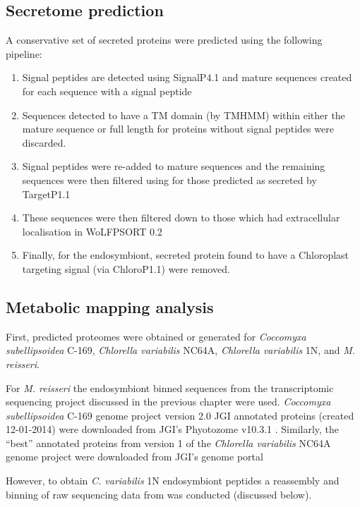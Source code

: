 \subsection{Secretome prediction}

A conservative set of secreted proteins were predicted 
using the following pipeline:
\begin{enumerate}
    \item Signal peptides are detected using SignalP4.1 and mature sequences
        created for each sequence with a signal peptide
    \item Sequences detected to have a TM domain (by TMHMM) within either the mature sequence or 
        full length for proteins without signal peptides were discarded.
    \item Signal peptides were re-added to mature sequences and the 
        remaining sequences were then filtered using for those predicted as secreted by TargetP1.1 
    \item These sequences were then filtered down to those which had extracellular
        localisation in WoLFPSORT 0.2 
    \item Finally, for the endosymbiont, secreted protein found to have a Chloroplast
        targeting signal (via ChloroP1.1) were removed.
\end{enumerate}

\subsection{Metabolic mapping analysis}

First, predicted proteomes were obtained or generated for
\textit{Coccomyxa subellipsoidea} C-169, \textit{Chlorella variabilis}
NC64A, \textit{Chlorella variabilis} 1N, and \textit{M. reisseri}. 

For \textit{M. reisseri} the endosymbiont binned sequences from the transcriptomic
sequencing project discussed in the previous chapter were used. 
\textit{Coccomyxa subellipsoidea} C-169 genome project \citep{Blanc2012} version 2.0 
JGI annotated proteins (created 12-01-2014) were downloaded from JGI's
Phyotozome v10.3.1 \citep{Goodstein2012}. 
Similarly, the ``best'' annotated proteins from
version 1 of the \textit{Chlorella variabilis} NC64A genome project \citep{Blanc2010}
were downloaded from JGI's genome portal \citep{Grigoriev2011,Nordberg2014}

However, to obtain \textit{C. variabilis} 1N endosymbiont peptides 
a reassembly and binning of raw sequencing data from \citep{Kodama2014}
was conducted (discussed below). 

